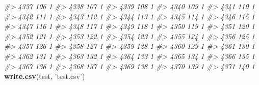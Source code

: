 \documentclass[]{article}
\newenvironment{Shaded}{\begin{snugshade}}{\end{snugshade}}
\newcommand{\CommentTok}[1]{\textcolor[rgb]{0.56,0.35,0.01}{\textit{#1}}}
\newcommand{\KeywordTok}[1]{\textcolor[rgb]{0.13,0.29,0.53}{\textbf{#1}}}
\newcommand{\NormalTok}[1]{#1}
\newcommand{\StringTok}[1]{\textcolor[rgb]{0.31,0.60,0.02}{#1}}
\begin{document}
\begin{Shaded}
\begin{Highlighting}[]
\CommentTok{#> 4337 106  1}
\CommentTok{#> 4338 107  1}
\CommentTok{#> 4339 108  1}
\CommentTok{#> 4340 109  1}
\CommentTok{#> 4341 110  1}
\CommentTok{#> 4342 111  1}
\CommentTok{#> 4343 112  1}
\CommentTok{#> 4344 113  1}
\CommentTok{#> 4345 114  1}
\CommentTok{#> 4346 115  1}
\CommentTok{#> 4347 116  1}
\CommentTok{#> 4348 117  1}
\CommentTok{#> 4349 118  1}
\CommentTok{#> 4350 119  1}
\CommentTok{#> 4351 120  1}
\CommentTok{#> 4352 121  1}
\CommentTok{#> 4353 122  1}
\CommentTok{#> 4354 123  1}
\CommentTok{#> 4355 124  1}
\CommentTok{#> 4356 125  1}
\CommentTok{#> 4357 126  1}
\CommentTok{#> 4358 127  1}
\CommentTok{#> 4359 128  1}
\CommentTok{#> 4360 129  1}
\CommentTok{#> 4361 130  1}
\CommentTok{#> 4362 131  1}
\CommentTok{#> 4363 132  1}
\CommentTok{#> 4364 133  1}
\CommentTok{#> 4365 134  1}
\CommentTok{#> 4366 135  1}
\CommentTok{#> 4367 136  1}
\CommentTok{#> 4368 137  1}
\CommentTok{#> 4369 138  1}
\CommentTok{#> 4370 139  1}
\CommentTok{#> 4371 140  1}
\KeywordTok{write.csv}\NormalTok{(test, }\StringTok{'test.csv'}\NormalTok{)}
\end{Highlighting}
\end{Shaded}
\end{document}
